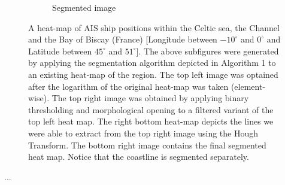 \documentclass{article}
\begin{document}
\begin{figure}[h]
\begin{subfigure}[b]{0.5\linewidth}
    \caption{Segmented image} 
    \label{fig7:d} 
  \end{subfigure} 
  \caption{A heat-map of AIS ship positions within the Celtic sea, the Channel and the Bay of Biscay (France) [Longitude between $-10^{\circ}$ and $0^{\circ}$ and Latitude between $45^{\circ}$ and $51^{\circ}$]. The above subfigures were generated by applying the segmentation algorithm depicted in Algorithm 1 to an existing heat-map of the region. The top left image was optained after the logarithm of the original heat-map was taken (element-wise). The top right image 
  was obtained by applying binary thresholding and morphological opening to a filtered variant of the top left heat map. The right bottom heat-map depicts the lines we were able to extract 
  from the top right image using the Hough Transform. The bottom right image contains the final segmented heat map. Notice that the coastline is segmented separately.}
  \label{fig7} 
\end{figure}

...
\end{document}
